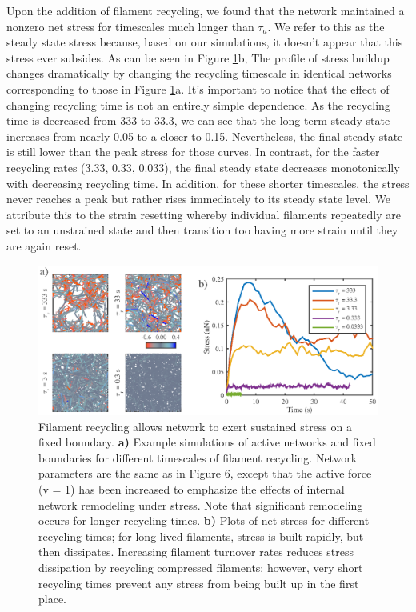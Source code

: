 \documentclass[10pt,letterpaper]{article}
\begin{document}
Upon the addition of filament recycling, we found that the network maintained a nonzero net stress for timescales much longer than $\tau_a$.  We refer to this as the steady state stress because, based on our simulations, it doesn't appear that this stress ever subsides.   As can be seen in Figure \ref{fig:active_rec}b, The profile of stress buildup changes dramatically by changing the recycling timescale in identical networks corresponding to those in Figure \ref{fig:active_rec}a.  It's important to notice that the effect of changing recycling time is not an entirely simple dependence.  As the recycling time is decreased from 333 to 33.3, we can see that the long-term steady state increases from nearly 0.05 to a closer to 0.15.  Nevertheless, the final steady state is still lower than the peak stress for those curves.  In contrast, for the faster recycling rates (3.33, 0.33, 0.033), the final steady state decreases monotonically with decreasing recycling time.  In addition, for these shorter timescales, the stress never reaches a peak but rather rises immediately to its steady state level.  We attribute this to the strain resetting whereby individual filaments repeatedly are set to an unstrained state and then transition too having more strain until they are again reset.


\begin{figure}[h!]
	\centering
	\includegraphics[width=\hsize]{figures/figure5b}
	\caption{\label{fig:active_rec}  Filament recycling allows network to exert sustained stress on a fixed boundary. \textbf{a)}  Example simulations of active networks and fixed boundaries for different timescales of filament recycling. Network parameters are the same as in Figure 6, except that the active force (v = 1) has been increased to emphasize the effects of internal network remodeling under stress. Note that significant remodeling occurs for longer recycling times.  \textbf{b)} Plots of net stress for different recycling times; for long-lived filaments, stress is built rapidly, but then dissipates.  Increasing filament turnover rates reduces stress dissipation by recycling compressed filaments; however, very short recycling times prevent any stress from being built up in the first place. }
\end{figure}
\end{document}
